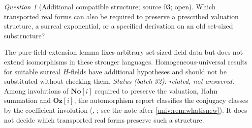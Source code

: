 \documentclass[11pt,letterpaper]{article}
\numberwithin{equation}{section}
\theoremstyle{definition}
\theoremstyle{remark}
\newtheorem{question}[question]{Question}
\newcommand{\No}{\mathbf{No}}
\begin{document}
\begin{question}[Additional compatible structure; source 03; open]\label{univ:q:compatible}
Which transported real forms can also be required to preserve a prescribed
valuation structure, a surreal exponential, or a specified derivation on an old
set-sized substructure?
\end{question}
The pure-field extension lemma fixes arbitrary set-sized field data but does not
extend isomorphisms in these stronger languages. Homogeneous-universal results
for suitable surreal $H$-fields \cite{vdDE2018} have additional hypotheses and
should not be substituted without checking them.
\emph{Status (batch 32): related, not answered.} Among involutions of $\No[i]$
required to preserve the valuation, Hahn summation and $\mathbf{Oz}[i]$, the
automorphism report classifies the conjugacy classes by the coefficient
involution (, ;
see the note after \cref{univ:rem:whatisnew}). It does not decide which
transported real forms preserve such a structure.
\end{document}
